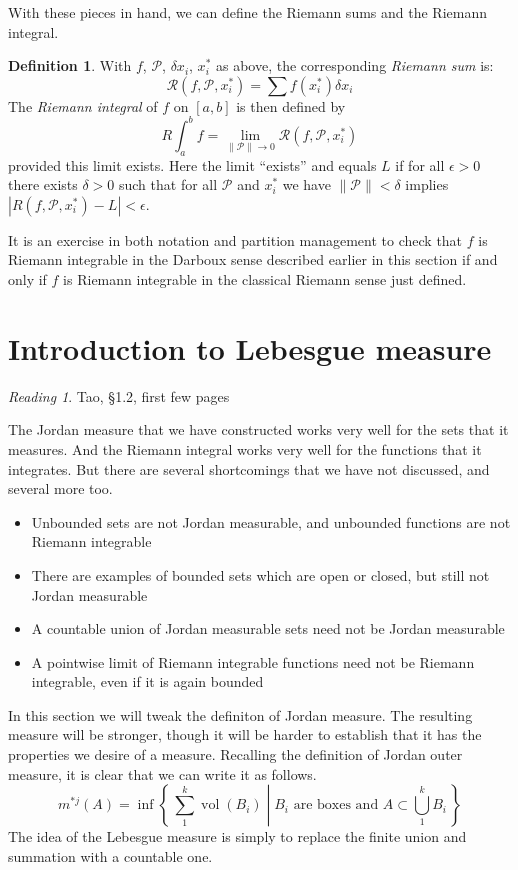 \documentclass[11pt,oneside]{amsbook}
\newcommand{\set}[1]{\left\{\,#1\,\right\}}
\DeclareMathOperator{\vol}{vol}
\theoremstyle{definition}
\theoremstyle{plain}
\theoremstyle{definition}
\newtheorem{defn}[thm]{Definition}
\theoremstyle{remark}
\newtheorem*{reading}{Reading}
\numberwithin{equation}{section}
\numberwithin{figure}{section}
\begin{document}
With these pieces in hand, we can define the Riemann sums and the Riemann integral.

\begin{defn}
  With $f$, $\mathcal P$, $\delta x_i$, $x_i^*$ as above, the corresponding \emph{Riemann sum} is:
  \[\mathcal R(f,\mathcal  P,x_i^*)=\sum f(x_i^*)\delta x_i
  \]
  The \emph{Riemann integral} of $f$ on $[a,b]$ is then defined by
  \[R\int_a^b f=\lim_{\|\mathcal P\|\to0}\mathcal R(f,\mathcal P,x_i^*)
  \]
  provided this limit exists. Here the limit ``exists'' and equals $L$ if for all $\epsilon>0$ there exists $\delta>0$ such that for all $\mathcal P$ and $x_i^*$ we have $\|\mathcal P\|<\delta$ implies $|R(f,\mathcal P,x_i^*)-L|<\epsilon$.
\end{defn}

It is an exercise in both notation and partition management to check that $f$ is Riemann integrable in the Darboux sense described earlier in this section if and only if $f$ is Riemann integrable in the classical Riemann sense just defined.


\section{Introduction to Lebesgue measure}

\begin{reading}
  Tao, \S1.2, first few pages
\end{reading}

The Jordan measure that we have constructed works very well for the sets that it measures. And the Riemann integral works very well for the functions that it integrates. But there are several shortcomings that we have not discussed, and several more too.
\begin{itemize}
\item Unbounded sets are not Jordan measurable, and unbounded functions are not Riemann integrable
\item There are examples of bounded sets which are open or closed, but still not Jordan measurable
\item A countable union of Jordan measurable sets need not be Jordan measurable
\item A pointwise limit of Riemann integrable functions need not be Riemann integrable, even if it is again bounded
\end{itemize}

In this section we will tweak the definiton of Jordan measure. The resulting measure will be stronger, though it will be harder to establish that it has the properties we desire of a measure. Recalling the definition of Jordan outer measure, it is clear that we can write it as follows.
\[m^{*j}(A)=\inf\set{\left.\sum_1^k \vol(B_i)\;\right|\;\text{$B_i$ are boxes and }A\subset\bigcup_1^kB_i}
\]
The idea of the Lebesgue measure is simply to replace the finite union and summation with a countable one.
\end{document}
